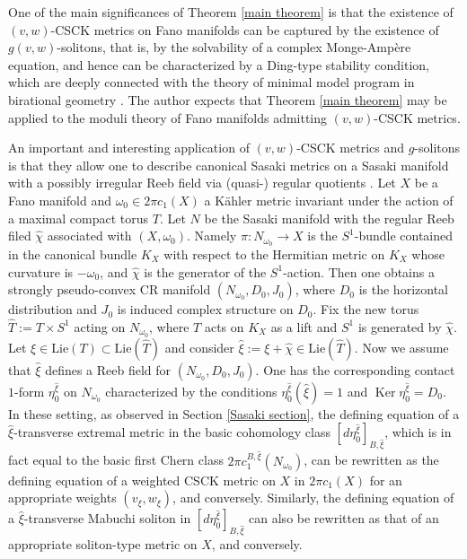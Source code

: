 \documentclass[12pt]{amsart}
\numberwithin{equation}{section}%
\theoremstyle{plain}
\theoremstyle{definition}
\newcommand{\Ker}[0]{\operatorname{Ker}}
\newcommand{\1}{\mathbf{1}}
\begin{document}
One of the main significances of Theorem \ref{main theorem} is that the existence of 
$(v,w)$-CSCK metrics on Fano manifolds can be captured by the existence of 
$g(v,w)$-solitons, that is, by the solvability of a complex Monge-Amp\`ere equation,
and hence can be characterized by a Ding-type stability condition,
which are deeply connected with the theory of minimal model program
in birational geometry \cite{HaLi20}.
The author expects that Theorem \ref{main theorem}
may be applied to the moduli theory of Fano manifolds admitting $(v,w)$-CSCK metrics.

An important and interesting application of $(v,w)$-CSCK metrics and $g$-solitons
is that they allow one to describe canonical Sasaki metrics on a Sasaki manifold
with a possibly irregular Reeb field
via (quasi-) regular quotients \cite{ACL21, AJL23}.
Let $X$ be a Fano manifold and $\omega_{0}\in 2\pi c_{1}(X)$ a K\"ahler metric
invariant under the action of a maximal compact torus $T$.
Let $N$ be the Sasaki manifold with the regular Reeb filed $\hat{\chi}$
associated with $(X,\omega_{0})$.
Namely $\pi:N_{\omega_{0}}\to X$ is the $S^{1}$-bundle contained in the canonical bundle $K_{X}$
with respect to the Hermitian metric on $K_{X}$ whose curvature is $-\omega_{0}$,
and $\hat{\chi}$ is the generator of the $S^{1}$-action.
Then one obtains a strongly pseudo-convex CR manifold $(N_{\omega_{0}}, D_{0},J_{0})$,
where $D_{0}$ is the horizontal distribution and $J_{0}$ is induced complex structure on $D_{0}$.
Fix the new torus $\hat{T}:=T\times S^{1}$ acting on $N_{\omega_{0}}$,
where $T$ acts on $K_{X}$ as a lift and $S^{1}$ is generated by $\hat{\chi}$.
Let $\xi\in\mathrm{Lie}(T)\subset\mathrm{Lie}(\hat{T})$
and consider $\hat{\xi}:=\xi+\hat{\chi}\in\mathrm{Lie}(\hat{T})$.
Now we assume that $\hat{\xi}$ defines a Reeb field for
$(N_{\omega_{0}}, D_{0},J_{0})$.
One has the corresponding contact $1$-form $\eta_{0}^{\hat{\xi}}$ on $N_{\omega_{0}}$
characterized by the conditions
$\eta_{0}^{\hat{\xi}}(\hat{\xi})=1$ and $\Ker\eta_{0}^{\hat{\xi}}=D_{0}$.
In these setting, as observed in Section \ref{Sasaki section},
the defining equation of a $\hat{\xi}$-transverse
extremal metric \cite{BGS08} in the basic cohomology class
$[d\eta_{0}^{\hat{\xi}}]_{B,\hat{\xi}}$,
which is in fact equal to the basic first Chern class
$2\pi c_{1}^{B,\hat{\xi}}(N_{\omega_{0}})$,
can be rewritten as the defining equation of a weighted CSCK metric
on $X$ in $2\pi c_{1}(X)$ for an appropriate weights $(v_{\xi},w_{\xi})$,
and conversely.
Similarly, the defining equation of a $\hat{\xi}$-transverse Mabuchi soliton
in $[d\eta_{0}^{\hat{\xi}}]_{B,\hat{\xi}}$
can also be rewritten as that of an appropriate soliton-type metric on $X$,
and conversely.
\end{document}
